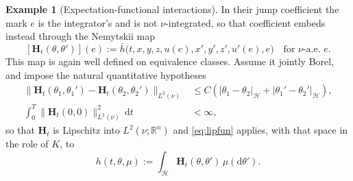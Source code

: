 \documentclass[preprint,12pt]{elsarticle}
\newcommand{\R}{\mathbb{R}}
\newcommand{\diff}{\mathrm{d}}
\numberwithin{equation}{section}
\theoremstyle{plain}
\theoremstyle{definition}
\theoremstyle{\PaperRemarkStyle}
\newtheorem{example}[theorem]{Example}
\begin{document}
\begin{example}[Expectation-functional interactions]
In their jump coefficient the mark $e$ is the integrator's and is not $\nu$-integrated, so
that coefficient embeds instead through the Nemytskii map
\[
[\mathbf H_t(\theta,\theta')](e):=\bar h\bigl(t,x,y,z,u(e),x',y',z',u'(e),e\bigr)
\quad\text{for $\nu$-a.e.\ }e .
\]
This map is again well defined on equivalence classes. Assume it jointly Borel, and impose the
natural quantitative hypotheses
\[
\begin{aligned}
\|\mathbf H_t(\theta_1,\theta_1')-\mathbf H_t(\theta_2,\theta_2')\|_{L^2(\nu)}
&\le C(|\theta_1-\theta_2|_{\mathcal H}+|\theta_1'-\theta_2'|_{\mathcal H}),\\
\int_0^T\|\mathbf H_t(0,0)\|_{L^2(\nu)}^2\,\diff t&<\infty ,
\end{aligned}
\]
so that $\mathbf H_t$ is Lipschitz into $L^2(\nu;\R^n)$ and \eqref{eq:lipfun} applies,
with that space in the role of $K$, to
\[
h(t,\theta,\mu):=\int_{\mathcal H}\mathbf H_t(\theta,\theta')\,\mu(\diff\theta') .
\]
\end{example}
\end{document}
